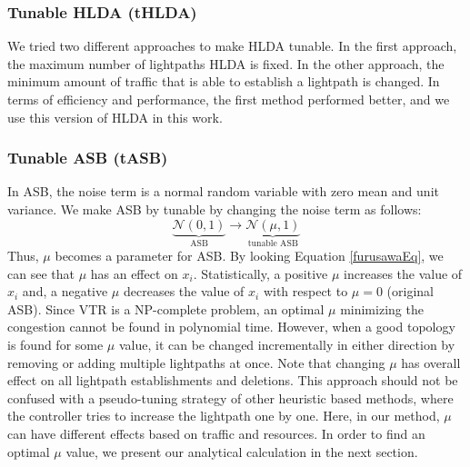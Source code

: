 \documentclass[conference]{IEEEtran}
\begin{document}
\subsubsection{Tunable HLDA (tHLDA)}
We tried two different approaches to make HLDA tunable. In the first approach, the maximum 
number of lightpaths HLDA is fixed. In the other approach, the minimum amount of traffic that is able to establish a lightpath
is changed. In terms of efficiency and performance, the first method performed better, and we use this version of HLDA in this work. 
 
\subsubsection{Tunable ASB (tASB)}
In ASB, the noise term is a normal random variable with zero mean and unit variance. We make ASB by tunable by changing the noise term as follows:
\begin{equation}
\underbrace{   \mathcal{N}(0,1)}_\text{ASB}   \rightarrow \underbrace{ \mathcal{N}(\mu,1) }_\text{tunable ASB}
\end{equation}
Thus,  $\mu$ becomes a parameter for ASB. 
By looking Equation \ref{furusawaEq}, we can see that $\mu$ has an effect on $x_i$.
Statistically, a positive $\mu$   increases the value of $x_i$ and, a negative $\mu$ decreases the value of $x_i$ with respect to $\mu=0$ (original ASB). 
Since VTR is a NP-complete problem, an optimal $\mu$ minimizing the congestion cannot be found in polynomial time.
However, when a good topology is found for some $\mu$ value, it can be changed incrementally in either direction by removing or adding multiple lightpaths at once.
Note that changing $\mu$ has overall effect on all lightpath establishments and deletions.
This approach should not be confused with a pseudo-tuning strategy of other heuristic based methods, where the controller tries to increase the lightpath one by one. 
Here, in our method, $\mu$ can have different effects based on traffic and resources. In order to find an optimal $\mu$ value, we present our analytical calculation in the next section.
\end{document}
